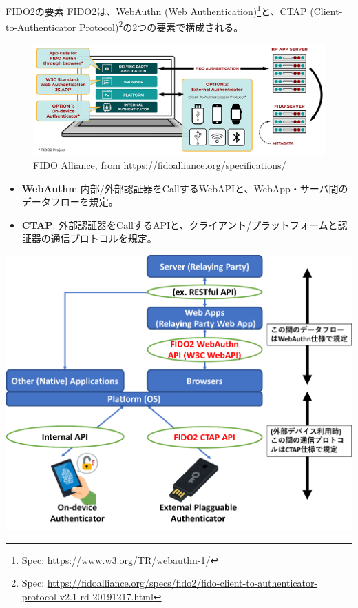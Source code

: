 \documentclass[12pt,dvipdfmx,uplatex]{beamer}
\begin{document}
\begin{frame}{FIDO2の要素}
FIDO2は、\alert{WebAuthn (Web Authentication)\footnote[frame]{\tiny Spec: \url{https://www.w3.org/TR/webauthn-1/}}と、CTAP (Client-to-Authenticator Protocol)\footnote[frame]{\tiny Spec: \url{https://fidoalliance.org/specs/fido2/fido-client-to-authenticator-protocol-v2.1-rd-20191217.html}}の2つの要素で構成}される。

\begin{figure}
\begin{center}
\includegraphics[width=0.9\linewidth]{Figs/FIDO2-Graphic-v2.png}
\caption{\footnotesize \textcopyright FIDO Alliance, from \url{https://fidoalliance.org/specifications/}}
\end{center}
\end{figure}
\end{frame}

\begin{frame}
\small 
\begin{itemize}
 \item \textbf{WebAuthn}: 内部/外部認証器をCallするWebAPIと、WebApp・サーバ間のデータフローを規定。
 \item \textbf{CTAP}: 外部認証器をCallするAPIと、クライアント/プラットフォームと認証器の通信プロトコルを規定。
\end{itemize}
\begin{center}
\includegraphics[width=0.7\linewidth]{Figs/FIDO2-spec-structure.pdf}
\end{center}
\end{frame}
\end{document}
